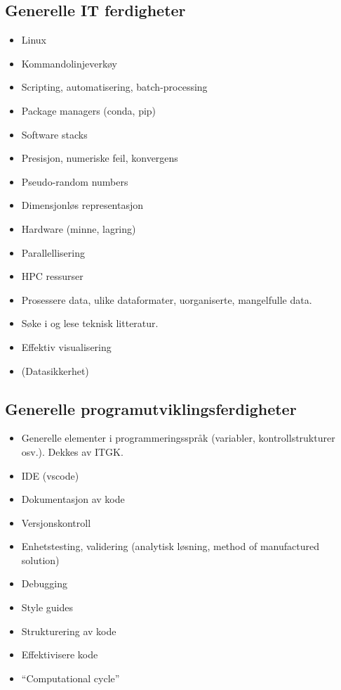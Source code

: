 \subsection{Generelle IT ferdigheter}
\begin{itemize}
	\item Linux
	\item Kommandolinjeverkøy
	\item Scripting, automatisering, batch-processing
	\item Package managers (conda, pip)
	\item Software stacks
	\item Presisjon, numeriske feil, konvergens
	\item Pseudo-random numbers
	\item Dimensjonløs representasjon
	\item Hardware (minne, lagring) 
	\item Parallellisering
	\item HPC ressurser
	\item Prosessere data, ulike dataformater, uorganiserte, mangelfulle data.
	\item Søke i og lese teknisk litteratur.
	\item Effektiv visualisering
	\item (Datasikkerhet)
\end{itemize}

\subsection{Generelle programutviklingsferdigheter}
\begin{itemize}
	\item Generelle elementer i programmeringsspråk (variabler, kontrollstrukturer osv.). Dekkes av ITGK.
	\item IDE (vscode)
	\item Dokumentasjon av kode
	\item Versjonskontroll
	\item Enhetstesting, validering (analytisk løsning, method of manufactured solution)
	\item Debugging
	\item Style guides
	\item Strukturering av kode
	\item Effektivisere kode
	\item \enquote{Computational cycle}
\end{itemize}

